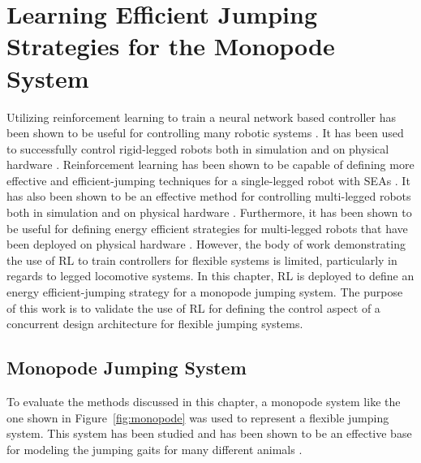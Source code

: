 \chapter{Learning Efficient Jumping Strategies for the Monopode System}
\label{chapter2}


Utilizing reinforcement learning to train a neural network based controller has been shown to be useful for controlling many robotic systems \cite{Vecerik2017, Plappert2018}. It has been used to successfully control rigid-legged robots both in simulation and on physical hardware \cite{Ha2020a, Zhao2020}. Reinforcement learning has been shown to be capable of defining more effective and efficient-jumping techniques for a single-legged robot with SEAs \cite{Fankhauser2013}. It has also been shown to be an effective method for controlling multi-legged robots both in simulation and on physical hardware \cite{Xiao2019, Haarnoja2019a, Tsounis2019}. Furthermore, it has been shown to be useful for defining energy efficient strategies for multi-legged robots that have been deployed on physical hardware \cite{Da2020c}. However, the body of work demonstrating the use of RL to train controllers for flexible systems is limited, particularly in regards to legged locomotive systems. In this chapter, RL is deployed to define an energy efficient-jumping strategy for a monopode jumping system. The purpose of this work is to validate the use of RL for defining the control aspect of a concurrent design architecture for flexible jumping systems.

\section{Monopode Jumping System}
\label{sec:monopode}
To evaluate the methods discussed in this chapter, a monopode system like the one shown in Figure~\ref{fig:monopode} was used to represent a flexible jumping system. This system has been studied and has been shown to be an effective base for modeling the jumping gaits for many different animals \cite{Blickhan1993a}.

